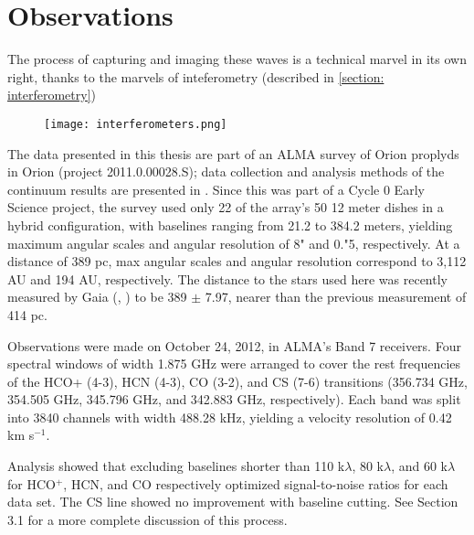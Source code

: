 \chapter{Observations}
\label{chap:observations}

The process of capturing and imaging these waves is a technical marvel in its own right, thanks to the marvels of inteferometry (described in \ref{section: interferometry})


\begin{figure}[b]
  \centering
  \texttt{[image: interferometers.png]}
  \label{fig:interferometers}
\end{figure}





The data presented in this thesis are part of an ALMA survey of Orion proplyds in Orion (project 2011.0.00028.S); data collection and analysis methods of the continuum results are presented in \citet{mann_alma_2014}. Since this was part of a Cycle 0 Early Science project, the survey used only 22 of the array's 50 12 meter dishes in a hybrid configuration, with baselines ranging from 21.2 to 384.2 meters, yielding maximum angular scales and angular resolution of 8" and 0."5, respectively. At a distance of 389 pc, max angular scales and angular resolution correspond to 3,112 AU and 194 AU, respectively. The distance to the stars used here was recently measured by Gaia (\citet{gaia_collaboration_gaia_2016}, \citet{gaia_collaboration_gaia_2018}) to be 389 $\pm$ 7.97, nearer than the previous measurement of 414 pc.
\bigskip

Observations were made on October 24, 2012, in ALMA's Band 7 receivers. Four spectral windows of width 1.875 GHz were arranged to cover the rest frequencies of the HCO+ (4-3), HCN (4-3), CO (3-2), and CS (7-6) transitions (356.734 GHz, 354.505 GHz, 345.796 GHz, and 342.883 GHz, respectively). Each band was split into 3840 channels with width 488.28 kHz, yielding a velocity resolution of 0.42 km s$^{-1}$.

\bigskip


Analysis showed that excluding baselines shorter than 110 k$\lambda$, 80 k$\lambda$, and 60 k$\lambda$ for HCO$^{+}$, HCN, and CO respectively optimized signal-to-noise ratios for each data set. The CS line showed no improvement with baseline cutting. See Section 3.1 for a more complete discussion of this process.


